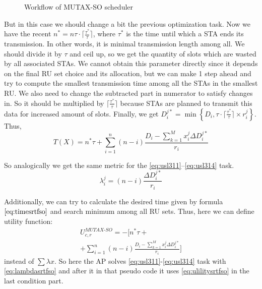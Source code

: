 \begin{figure}[tb]
\begin{scaletikzpicturetowidth}{\columnwidth}
	\end{scaletikzpicturetowidth}
	\caption{\label{fig:mutexso} Workflow of MUTAX-SO scheduler}		
\end{figure}

But in this case we should change a bit the previous optimization task. Now we have the recent $n^* = n\tau\cdot\lceil\frac{\tau^*}{\tau}\rceil$, where $\tau^*$ is the time until which a STA ends its transmission. In other words, it is minimal transmission length among all. We should divide it by $\tau$ and ceil up, so we get the quantity of slots which are wasted by all associated STAs. We cannot obtain this parameter directly since it depends on the final RU set choice and its allocation, but we can make 1 step ahead and try to compute the smallest transmission time among all the STAs in the smallest RU. We also need to change the subtracted part in numerator to satisfy changes in. So it should be multiplied by $\lceil\frac{\tau^*}{\tau}\rceil$ because STAs are planned to transmit this data for increased amount of slots. Finally, we get $D_i^{j*} = \min\left\{D_i, \tau\cdot\lceil\frac{\tau^*}{\tau}\rceil \times r_{i}^{j}\right\}$. Thus,  
\begin{equation}
\label{eq:timesrtfso}
T\left(X\right) = n^* \tau + \sum_{i = 1}^{n} \left(n - i\right) \frac{D_i -  \sum_{k = 1}^{M} x_i^j \Delta D_i^{j*}}{r_{i}}
\end{equation}

So analogically we get the same metric for the \eqref{eq:usl311}--\eqref{eq:usl314} task.
\begin{equation}
\label{eq:lambdasrtfso}
\lambda_i^j = \left(n - i\right) \frac{\Delta D_i^{j*}}{r_{i}}
\end{equation}

Additionally, we can try to calculate the desired time given by formula $\eqref{eq:timesrtfso}$ and search minimum among all RU sets. Thus, here we can define utility function:
\begin{multline}
\label{eq:ulilitysrtfso}
U_{c,r}^{MUTAX\text{-}SO} = -\Biggl[ n^* \tau +\\
+ \sum_{i = 1}^{n} \left(n - i\right) \frac{D_i -  \sum_{k = 1}^{M} x_i^j \Delta D_i^{j*}}{r_{i}}\Biggr]
\end{multline}
instead of $\sum \lambda x$. So here the AP solves \eqref{eq:usl311}-\eqref{eq:usl314} task with \eqref{eq:lambdasrtfso} and after it in that pseudo code it uses \eqref{eq:ulilitysrtfso} in the last condition part.

